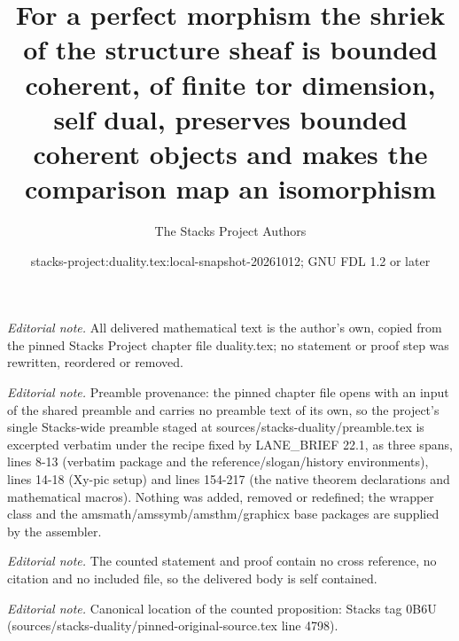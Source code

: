 \documentclass[10pt,a4paper]{amsart}
\title{For a perfect morphism the shriek of the structure sheaf is bounded coherent, of finite tor dimension, self dual, preserves bounded coherent objects and makes the comparison map an isomorphism}
\author{The Stacks Project Authors}
\date{stacks-project:duality.tex:local-snapshot-20261012; GNU FDL 1.2 or later}
\theoremstyle{plain}
\theoremstyle{definition}
\theoremstyle{remark}
\numberwithin{equation}{subsection}
\begin{document}
\maketitle
\noindent\textit{Editorial note.} All delivered mathematical text is the author's own, copied from the pinned Stacks Project chapter file duality.tex; no statement or proof step was rewritten, reordered or removed.\par\medskip
\noindent\textit{Editorial note.} Preamble provenance: the pinned chapter file opens with an input of the shared preamble and carries no preamble text of its own, so the project's single Stacks-wide preamble staged at sources/stacks-duality/preamble.tex is excerpted verbatim under the recipe fixed by LANE\_BRIEF 22.1, as three spans, lines 8-13 (verbatim package and the reference/slogan/history environments), lines 14-18 (Xy-pic setup) and lines 154-217 (the native theorem declarations and mathematical macros). Nothing was added, removed or redefined; the wrapper class and the amsmath/amssymb/amsthm/graphicx base packages are supplied by the assembler.\par\medskip
\noindent\textit{Editorial note.} The counted statement and proof contain no cross reference, no citation and no included file, so the delivered body is self contained.\par\medskip
\noindent\textit{Editorial note.} Canonical location of the counted proposition: Stacks tag 0B6U (sources/stacks-duality/pinned-original-source.tex line 4798).\par\medskip
\end{document}
